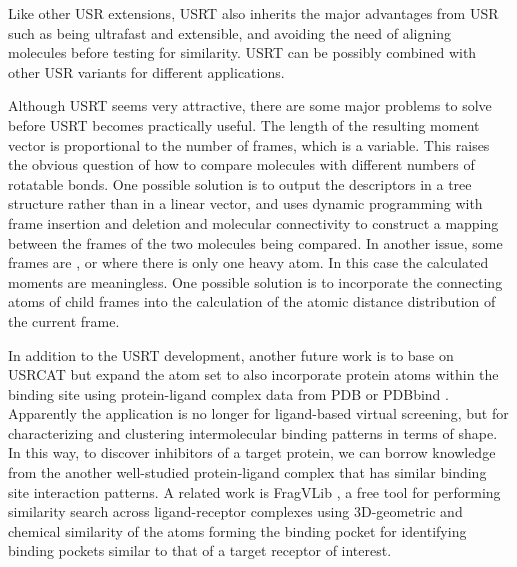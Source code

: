 Like other USR extensions, USRT also inherits the major advantages from USR such as being ultrafast and extensible, and avoiding the need of aligning molecules before testing for similarity. USRT can be possibly combined with other USR variants \citep{1333,1338,1331} for different applications.

Although USRT seems very attractive, there are some major problems to solve before USRT becomes practically useful. The length of the resulting moment vector is proportional to the number of frames, which is a variable. This raises the obvious question of how to compare molecules with different numbers of rotatable bonds. One possible solution is to output the descriptors in a tree structure rather than in a linear vector, and uses dynamic programming with frame insertion and deletion and molecular connectivity to construct a mapping between the frames of the two molecules being compared. In another issue, some frames are ,  or  where there is only one heavy atom. In this case the calculated moments are meaningless. One possible solution is to incorporate the connecting atoms of child frames into the calculation of the atomic distance distribution of the current frame.

In addition to the USRT development, another future work is to base on USRCAT \citep{1331} but expand the atom set to also incorporate protein atoms within the binding site using protein-ligand complex data from PDB \citep{540,537} or PDBbind \citep{529,530,1426}. Apparently the application is no longer for ligand-based virtual screening, but for characterizing and clustering intermolecular binding patterns in terms of shape. In this way, to discover inhibitors of a target protein, we can borrow knowledge from the another well-studied protein-ligand complex that has similar binding site interaction patterns. A related work is FragVLib \citep{1247}, a free tool for performing similarity search across ligand-receptor complexes using 3D-geometric and chemical similarity of the atoms forming the binding pocket for identifying binding pockets similar to that of a target receptor of interest.

\chapterend
